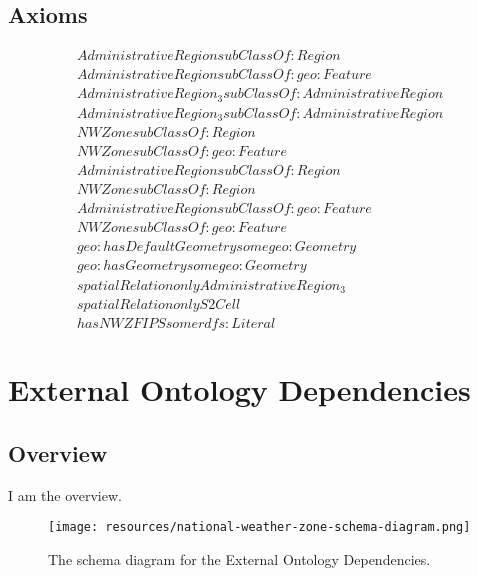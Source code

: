 \subsection{Axioms}
\begin{align}
  AdministrativeRegion subClassOf: Region\\
  AdministrativeRegion subClassOf: geo:Feature\\
  AdministrativeRegion_3 subClassOf: AdministrativeRegion\\
  AdministrativeRegion_3 subClassOf: AdministrativeRegion\\
  NWZone subClassOf: Region\\
  NWZone subClassOf: geo:Feature\\
  AdministrativeRegion subClassOf: Region\\
  NWZone subClassOf: Region\\
  AdministrativeRegion subClassOf: geo:Feature\\
  NWZone subClassOf: geo:Feature\\
  geo:hasDefaultGeometry some geo:Geometry \\
  geo:hasGeometry some geo:Geometry \\
  spatialRelation only AdministrativeRegion_3 \\
  spatialRelation only S2Cell \\
  hasNWZFIPS some rdfs:Literal \end{align}



\section{External Ontology Dependencies}
\label{sec:external-ontology-dependencies}
\subsection{Overview}
\label{ssec:overview}

I am the overview.

\begin{figure}[h!]
  \begin{center}
    \texttt{[image: resources/national-weather-zone-schema-diagram.png]}
  \end{center}
  \caption{The schema diagram for the External Ontology Dependencies.}
  \label{fig:ov-diagram}
\end{figure}


